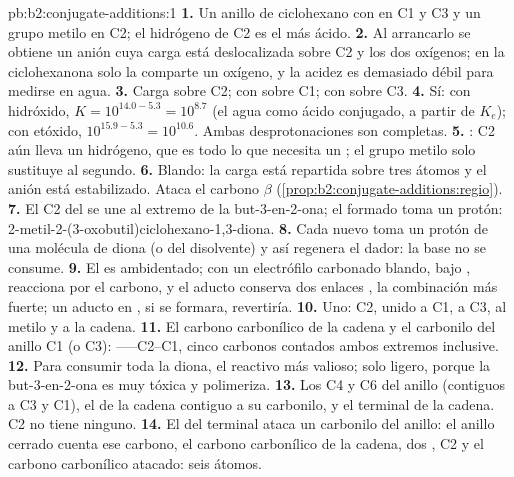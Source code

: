 \begin{solution}{pb:b2:conjugate-additions:1}
\textbf{1.} Un anillo de ciclohexano con  en C1 y C3 y un grupo metilo en C2; el hidrógeno de C2
es el más ácido.
\textbf{2.} Al arrancarlo se obtiene un anión cuya carga está deslocalizada sobre C2 y los dos oxígenos; en la
ciclohexanona solo la comparte un oxígeno, y la acidez es demasiado débil para medirse en agua.
\textbf{3.} Carga sobre C2;  con  sobre C1;  con  sobre C3.
\textbf{4.} Sí: con hidróxido, $K = 10^{14.0 - 5.3} = 10^{8.7}$ (el agua como ácido conjugado, a partir de
$K_e$); con etóxido, $10^{15.9-5.3} = 10^{10.6}$. Ambas desprotonaciones son completas.
\textbf{5.} : C2 aún lleva un hidrógeno, que es todo lo que necesita un ; el grupo
metilo solo sustituye al segundo.
\textbf{6.} Blando: la carga está repartida sobre tres átomos y el anión está estabilizado. Ataca el
carbono $\beta$ (\cref{prop:b2:conjugate-additions:regio}).
\textbf{7.} El C2 del  se une al extremo  de la but-3-en-2-ona; el  formado toma un
protón: 2-metil-2-(3-oxobutil)ciclohexano-1,3-diona.
\textbf{8.} Cada nuevo  toma un protón de una molécula de diona (o del disolvente) y así
regenera el  dador: la base no se consume.
\textbf{9.} El  es ambidentado; con un electrófilo carbonado blando, bajo , reacciona
por el carbono, y el aducto  conserva dos enlaces , la combinación más fuerte; un
aducto en , si se formara, revertiría.
\textbf{10.} Uno: C2, unido a C1, a C3, al metilo y a la cadena.
\textbf{11.} El carbono carbonílico de la cadena y el carbonilo del anillo C1 (o C3): ------C2--C1,
cinco carbonos contados ambos extremos inclusive.
\textbf{12.} Para consumir toda la diona, el reactivo más valioso; solo ligero, porque la but-3-en-2-ona
es muy tóxica y polimeriza.
\textbf{13.} Los C4 y C6 del anillo (contiguos a C3 y C1), el  de la cadena contiguo a su carbonilo, y el
 terminal de la cadena. C2 no tiene ninguno.
\textbf{14.} El  del  terminal ataca un carbonilo del anillo: el anillo cerrado cuenta ese
carbono, el carbono carbonílico de la cadena, dos , C2 y el carbono carbonílico atacado: seis átomos.

\end{solution}
